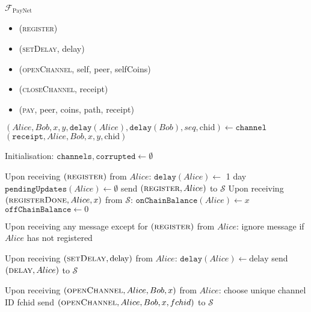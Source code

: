\begin{functionality}{$\mathcal{F}_{\mathrm{PayNet}}$}
  \label{alg:payfunc}
    \begin{itemize}
      \item (\textsc{register})
      \item (\textsc{setDelay}, delay)
      \item (\textsc{openChannel}, self, peer, selfCoins)
      \item (\textsc{closeChannel}, receipt)
      \item (\textsc{pay}, peer, coins, path, receipt)
    \end{itemize}

  \begin{algorithmic}[1]
      \State $\left(Alice, Bob, x, y, \mathtt{delay}\left(Alice\right),
      \mathtt{delay}\left(Bob\right), seq, \mathrm{chid}\right) \gets
      \mathtt{channel}$
      \State \Return $\left(\mathtt{receipt}, Alice, Bob, x, y,
      \mathrm{chid}\right)$
    \EndFunction
    \State

    \State Initialisation:
    \Indent
      \State $\mathtt{channels}, \mathtt{corrupted} \gets \emptyset$
    \EndIndent
    \State

    \State Upon receiving $\left(\textsc{register}\right)$ from $Alice$:
    \Indent
      \State $\mathtt{delay}\left(Alice\right) \gets$ 1 day 
      \State $\mathtt{pendingUpdates}\left(Alice\right) \gets \emptyset$
      \State send $\left(\textsc{register}, Alice\right)$ to $\mathcal{S}$
\EndIndent
    \State Upon receiving $\left(\textsc{registerDone},Alice, x\right)$ from $\mathcal{S}$:
\Indent 
      \State  $\mathtt{onChainBalance}\left(Alice\right) \gets x$
      \State $\mathtt{offChainBalance} \gets 0$
    \EndIndent
    \State

    \State Upon receiving any message except for
    $\left(\textsc{register}\right)$ from $Alice$:
    \Indent
      \State ignore message if $Alice$ has not registered
    \EndIndent
    \State

    \State Upon receiving $\left(\textsc{setDelay}, \mathrm{delay}\right)$ from
    $Alice$:
    \Indent
      \State $\mathtt{delay}\left(Alice\right) \gets \mathrm{delay}$
      \State send $\left(\textsc{delay}, Alice\right)$ to $\mathcal{S}$
    \EndIndent
    \State

    \State Upon receiving $\left(\textsc{openChannel}, Alice, Bob, x\right)$
    from $Alice$:
    \Indent
      \State choose unique channel ID fchid
      \State send $\left(\textsc{openChannel}, Alice, Bob, x, fchid \right)$ to
      $\mathcal{S}$
    \EndIndent


\end{algorithmic}
\end{functionality}
